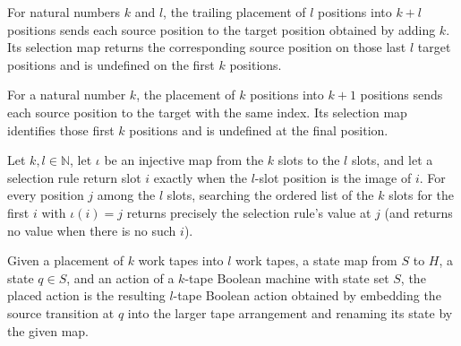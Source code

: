 \begin{definition}
\label{Complexity.clPlacement.trailing}
\leanok
{}
For natural numbers $k$ and $l$, the trailing placement of $l$ positions into $k+l$
positions sends each source position to the target position obtained by adding $k$. Its
selection map returns the corresponding source position on those last $l$ target
positions and is undefined on the first $k$ positions.
\end{definition}

\begin{definition}
\label{Complexity.clKeepLastPlacement}
\leanok
{}
For a natural number $k$, the placement of $k$ positions into $k+1$ positions sends each
source position to the target with the same index. Its selection map identifies those
first $k$ positions and is undefined at the final position.
\end{definition}

\begin{lemma}
\label{Complexity.clPlacement_lookup}
\leanok
{}
Let $k,l\in\mathbb{N}$, let $\iota$ be an injective map from the $k$ slots to the $l$
slots, and let a selection rule return slot $i$ exactly when the $l$-slot position is
the image of $i$. For every position $j$ among the $l$ slots, searching the ordered list
of the $k$ slots for the first $i$ with $\iota(i)=j$ returns precisely the selection
rule's value at $j$ (and returns no value when there is no such $i$).
\end{lemma}

\begin{definition}
\label{Complexity.clPlacedAction}
\leanok
{}
Given a placement of $k$ work tapes into $l$ work tapes, a state map from $S$ to $H$, a
state $q\in S$, and an action of a $k$-tape Boolean machine with state set $S$, the
placed action is the resulting $l$-tape Boolean action obtained by embedding the source
transition at $q$ into the larger tape arrangement and renaming its state by the given
map.
\end{definition}

